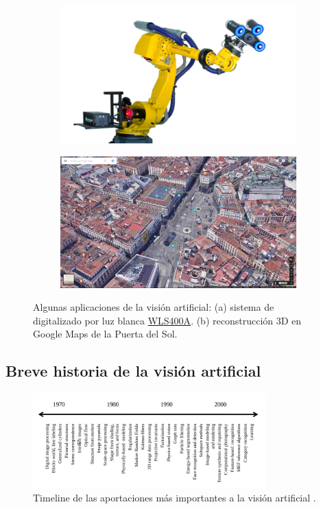 \begin{figure}
  \begin{subfigure}{.5\textwidth}
    \centering
    \includegraphics[width=.9\linewidth]{images/camera.jpg}
    \caption { }
    \label{fig:apps1a}
  \end{subfigure}%
  \begin{subfigure}{.5\textwidth}
    \centering
    \includegraphics[width=.9\linewidth]{images/maps.jpg}
    \caption { }
    \label{fig:apps1b}
  \end{subfigure}
  \caption{Algunas aplicaciones de la visión artificial: (a) sistema de digitalizado por luz blanca \href{http://www.hexagonmi.com/es-ES/products/white-light-scanner-systems/hexagon-metrology-wls400a}{WLS400A}. (b) reconstrucción 3D en Google Maps de la Puerta del Sol. }
  \label{fig:applications}
\end{figure}

\subsection{Breve historia de la visión artificial}

\begin{figure}[H]
  \centering
  \includegraphics[width=0.8\textwidth]{images/timeline}
  \caption{Timeline de las aportaciones más importantes a la visión artificial \cite{book:szeliski}.}
\end{figure}


